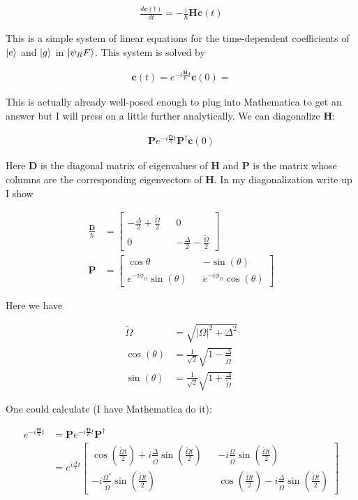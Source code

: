 \documentclass[12pt]{article}
\newcommand{\ddt}[1]{\frac{d #1}{dt}}
\newcommand{\bv}[1]{\boldsymbol{#1}}
\begin{document}
\begin{align}
\ddt{\bv{c}(t)} = -\frac{i}{\hbar}\bv{H}\bv{c}(t)
\end{align}

This is a simple system of linear equations for the time-dependent coefficients of $\ket{e}$ and $\ket{g}$ in $\ket{\psi_RF}$. This system is solved by

\begin{align}
\bv{c}(t) = e^{-i\frac{\bv{H}}{\hbar} t} \bv{c}(0) =
\end{align}

This is actually already well-posed enough to plug into Mathematica to get an answer but I will press on a little further analytically. We can diagonalize $\bv{H}$:

\begin{align}
\bv{P}e^{-i\frac{\bv{D}}{\hbar}t}\bv{P}^{\dag} \bv{c}(0)
\end{align} 

Here $\bv{D}$ is the diagonal matrix of eigenvalues of $\bv{H}$ and $\bv{P}$ is the matrix whose columns are the corresponding eigenvectors of $\bv{H}$. In my diagonalization write up I show

\begin{align}
\frac{\bv{D}}{\hbar} &= 
\begin{bmatrix}
-\frac{\Delta}{2} + \frac{\tilde{\Omega}}{2} && 0
\\0 && -\frac{\Delta}{2} - \frac{\tilde{\Omega}}{2}
\end{bmatrix}\\
\bv{P} &= 
\begin{bmatrix}
\cos{\theta} && -\sin(\theta)\\
e^{-i\phi_{\Omega}}\sin(\theta) && e^{-i\phi_{\Omega}}\cos(\theta)
\end{bmatrix}
\end{align}

Here we have

\begin{align}
\tilde{\Omega} &= \sqrt{|\Omega|^2+\Delta^2}\\
\cos(\theta) &= \frac{1}{\sqrt{2}}\sqrt{1-\frac{\Delta}{\tilde{\Omega}}}\\
\sin(\theta) &= \frac{1}{\sqrt{2}}\sqrt{1+\frac{\Delta}{\tilde{\Omega}}}
\end{align}

One could calculate (I have Mathematica do it):

\begin{align}
e^{-i \frac{\bv{H}}{\hbar}t} &= \bv{P}e^{-i\frac{\bv{D}}{\hbar} t}\bv{P}^{\dag}\\
&= e^{i \frac{\Delta}{2} t}
\begin{bmatrix}
\cos\left(\frac{\tilde{\Omega}t}{2}\right) + i \frac{\Delta}{\tilde{\Omega}}\sin\left(\frac{\tilde{\Omega}t}{2}\right) && -i \frac{\Omega}{\tilde{\Omega}}\sin\left(\frac{\tilde{\Omega}t}{2}\right)\\
-i\frac{\Omega^*}{\tilde{\Omega}}\sin\left(\frac{\tilde{\Omega}t}{2}\right)&& \cos\left(\frac{\tilde{\Omega}t}{2}\right) - i \frac{\Delta}{\tilde{\Omega}}\sin\left(\frac{\tilde{\Omega}t}{2}\right)
\end{bmatrix}
\end{align}
\end{document}
